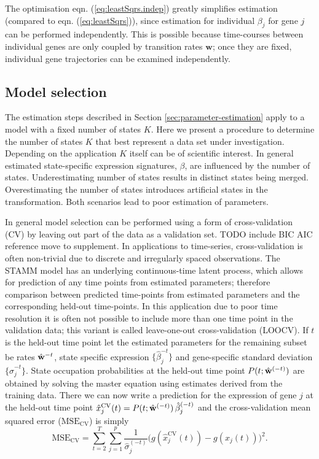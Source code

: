 The optimisation eqn. (\ref{eq:leastSqrs.indep}) greatly simplifies estimation (compared to  eqn. (\ref{eq:leastSqrs})), since estimation for individual $\beta_j$ for gene $j$ can be performed independently. This is possible because time-courses between individual genes are only coupled by transition rates $\mathbf{w}$; once they are fixed, individual gene trajectories can be examined independently. 

\subsection{Model selection}
\label{sec:model-selection}

The estimation steps described in Section \ref{sec:parameter-estimation} apply to a model with a fixed number of states $K$. Here we present a procedure to determine the number of states $K$ that best represent a data set under investigation. Depending on the application $K$ itself can be of scientific interest. In general estimated state-specific expression signatures, $\beta$, are influenced by the number of states. Underestimating number of states results in distinct states being merged. Overestimating the number of states introduces artificial states in the transformation. Both scenarios lead to poor estimation of parameters. 

In general model selection can be performed using a form of cross-validation (CV) by leaving out part of the data as a validation set.  {\color{red} TODO include BIC AIC reference move to supplement}. In applications to time-series, cross-validation is often non-trivial due to discrete and irregularly spaced observations. The STAMM model has an underlying continuous-time latent process, which allows for prediction of any time points from estimated parameters; therefore comparison between predicted time-points from estimated parameters and the corresponding held-out time-points. In this application due to poor time resolution it is often not possible to include more than one time point in the validation data; this variant is called leave-one-out cross-validation (LOOCV). If $t$ is the held-out time point let the estimated parameters for the remaining subset be rates $\hat{\bf{w}}^{-t}$, state specific expression $\lbrace \hat{\beta}_j^{-t} \rbrace$ and gene-specific standard deviation $\lbrace \hat{\sigma}_j^{-t} \rbrace$. State occupation probabilities at the held-out time point  $P(t; \hat{\bf{w}}^{(-t)})$ are obtained by solving the master equation using estimates derived from the training data. There we can now write a prediction for the expression of gene $j$ at the held-out time point $\hat{x}^{\mathrm{CV}}_j(t) = P(t; \hat{\bf{w}}^{(-t)})\, \hat{\beta}_j^{(-t)}$ and the cross-validation 
mean squared error ($\mathrm{MSE_{CV}}$) is simply
\begin{equation}
  \mathrm{MSE_{CV}}  =  \sum_{t=2}^T \sum_{j=1}^p \frac{1}{\hat{\sigma}_j^{(-t)}}\bigl( g(\hat{x}^{\mathrm{CV}}_j(t)) - g(x_j(t)) \bigr)^2.
  \label{eq:mse-cv}
\end{equation}

